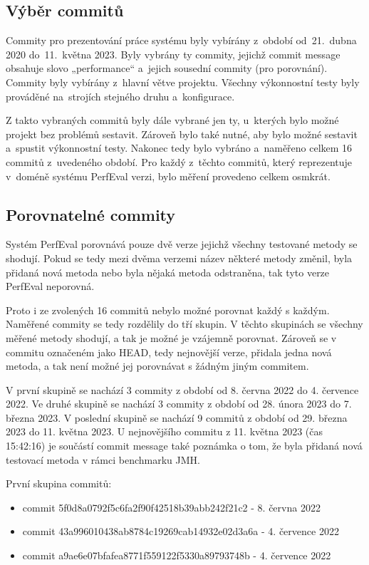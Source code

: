 \subsection{Výběr commitů}

Commity pro prezentování práce systému byly vybírány z~období od~21.~dubna 2020 do~11.~května 2023.
Byly vybrány ty commity, jejichž commit message obsahuje slovo „performance“ a~jejich sousední commity (pro porovnání).
Commity byly vybírány z~hlavní větve projektu. Všechny výkonnostní testy byly prováděné na~strojích stejného druhu a~konfigurace.

Z takto vybraných commitů byly dále vybrané jen ty, u~kterých bylo možné projekt bez problémů sestavit. Zároveň bylo také nutné,
aby bylo možné sestavit a~spustit výkonnostní testy. Nakonec tedy bylo vybráno a~naměřeno celkem 16 commitů z~uvedeného období.
Pro každý z~těchto commitů, který reprezentuje v~doméně systému PerfEval verzi, bylo měření provedeno celkem osmkrát.

\subsection{Porovnatelné commity}

Systém PerfEval porovnává pouze dvě verze jejichž všechny testované metody se shodují. Pokud se tedy mezi dvěma
verzemi název některé metody změnil, byla přidaná nová metoda nebo byla nějaká metoda odstraněna, tak tyto verze
PerfEval neporovná.

Proto i ze zvolených 16 commitů nebylo možné porovnat každý s každým. Naměřené commity se tedy rozdělily do tří skupin.
V těchto skupinách se všechny měřené metody shodují, a tak je možné je vzájemně porovnat. Zároveň se v commitu
označeném jako HEAD, tedy nejnovější verze, přidala jedna nová metoda, a tak není možné jej porovnávat s žádným jiným commitem.

V první skupině se nachází 3 commity z období od 8. června 2022 do 4. července 2022.
Ve druhé skupině se nachází 3 commity z období od 28. února 2023 do 7. března 2023.
V poslední skupině se nachází 9 commitů z období od 29. března 2023 do 11. května 2023.
U nejnovějšího commitu z 11. května 2023 (čas 15:42:16) je součástí commit message také poznámka o tom,
že byla přidaná nová testovací metoda v rámci benchmarku JMH.

\medskip

První skupina commitů:
\begin{itemize}
    \item commit 5f0d8a0792f5c6fa2f90f42518b39abb242f21c2 - 8. června 2022
    \item commit 43a996010438ab8784c19269cab14932e02d3a6a - 4. července 2022
    \item commit a9ae6e07bfafea8771f559122f5330a89793748b - 4. července 2022
\end{itemize}

